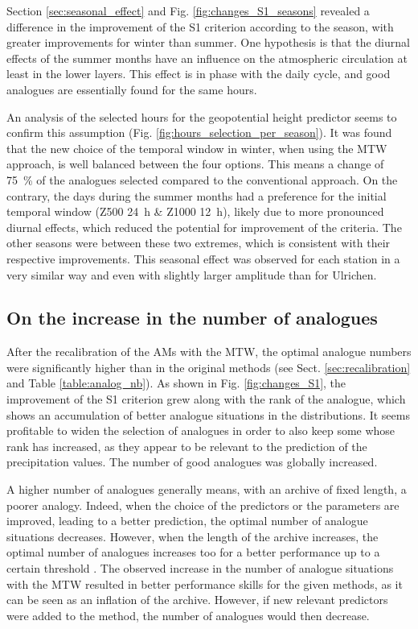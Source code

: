 \documentclass[hess, manuscript]{copernicus}
\begin{document}
	Section \ref{sec:seasonal_effect} and Fig. \ref{fig:changes_S1_seasons} revealed a difference in the improvement of the S1 criterion according to the season, with greater improvements for winter than summer. One hypothesis is that the diurnal effects of the summer months have an influence on the atmospheric circulation at least in the lower layers. This effect is in phase with the daily cycle, and good analogues are essentially found for the same hours.
	
	An analysis of the selected hours for the geopotential height predictor seems to confirm this assumption (Fig. \ref{fig:hours_selection_per_season}). It was found that the new choice of the temporal window in winter, when using the MTW approach, is well balanced between the four options. This means a change of 75~\% of the analogues selected compared to the conventional approach. On the contrary, the days during the summer months had a preference for the initial temporal window (Z500 24~h \& Z1000 12~h), likely due to more pronounced diurnal effects, which reduced the potential for improvement of the criteria. The other seasons were between these two extremes, which is consistent with their respective improvements. This seasonal effect was observed for each station in a very similar way and even with slightly larger amplitude than for Ulrichen.
	
	
	\subsection{On the increase in the number of analogues}
	
	After the recalibration of the AMs with the MTW, the optimal analogue numbers were significantly higher than in the original methods (see Sect. \ref{sec:recalibration} and Table \ref{table:analog_nb}). As shown in Fig. \ref{fig:changes_S1}, the improvement of the S1 criterion grew along with the rank of the analogue, which shows an accumulation of better analogue situations in the distributions. It seems profitable to widen the selection of analogues in order to also keep some whose rank has increased, as they appear to be relevant to the prediction of the precipitation values. The number of good analogues was globally increased.
	
	A higher number of analogues generally means, with an archive of fixed length, a poorer analogy. Indeed, when the choice of the predictors or the parameters are improved, leading to a better prediction, the optimal number of analogue situations decreases. However, when the length of the archive increases, the optimal number of analogues increases too for a better performance up to a certain threshold \citep[][]{Bontron2004, Hamill2006a}. The observed increase in the number of analogue situations with the MTW resulted in better performance skills for the given methods, as it can be seen as an inflation of the archive. However, if new relevant predictors were added to the method, the number of analogues would then decrease.
	
\end{document}
